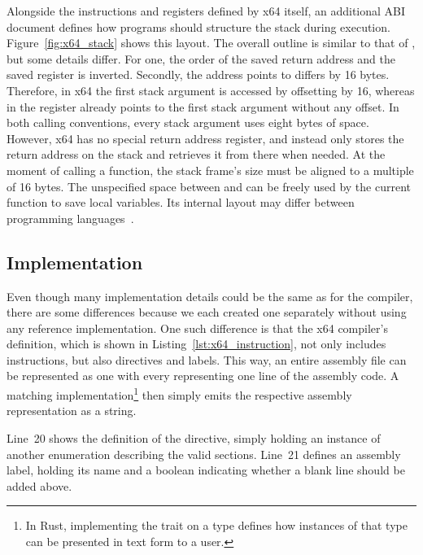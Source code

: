 Alongside the instructions and registers defined by x64 itself, an additional ABI document defines how programs should structure the stack during execution.
Figure~\ref{fig:x64_stack} shows this layout.
The overall outline is similar to that of \riscv{}, but some details differ.
For one, the order of the saved return address and the saved  register is inverted.
Secondly, the address  points to differs by 16 bytes.
Therefore, in x64 the first stack argument is accessed by offsetting  by 16, whereas in \riscv{} the  register already points to the first stack argument without any offset.
In both calling conventions, every stack argument uses eight bytes of space.
However, x64 has no special return address register, and instead only stores the return address on the stack and retrieves it from there when needed.
At the moment of calling a function, the stack frame's size must be aligned to a multiple of 16 bytes.
The unspecified space between  and  can be freely used by the current function to save local variables.
Its internal layout may differ between programming languages~\cite[p.~21]{Lu2022}.

\subsection{Implementation}


Even though many implementation details could be the same as for the \riscv{} compiler, there are some differences because we each created one separately without using any reference implementation.
One such difference is that the x64 compiler's  definition, which is shown in Listing~\ref{lst:x64_instruction}, not only includes instructions, but also directives and labels.
This way, an entire assembly file can be represented as one  with every  representing one line of the assembly code.
A matching  implementation\footnote{In Rust, implementing the  trait on a type defines how instances of that type can be presented in text form to a user.} then simply emits the respective assembly representation as a string.

Line~20 shows the definition of the  directive, simply holding an instance of another enumeration describing the valid sections.
Line~21 defines an assembly label, holding its name and a boolean indicating whether a blank line should be added above.

